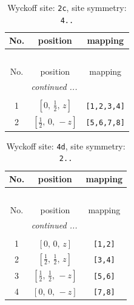 \documentclass[fleqn,8pt]{jsarticle}
\begin{document}
\renewcommand{\arraystretch}{1.2}
\begin{longtable}{ccc}
\caption{Wyckoff site: {\tt 2c}, site symmetry: {\tt 4..}}
 \\
 \hline \hline
No. & position & mapping \\ \hline \endfirsthead

\multicolumn{2}{l}{\tablename\ \thetable{}} \\
 \hline \hline
No. & position & mapping \\ \hline \endhead

 \hline \hline
\multicolumn{2}{r}{\footnotesize\it continued ...} \\ \endfoot

 \hline \hline
\multicolumn{2}{r}{} \\ \endlastfoot

1 & $\left[ 0,\, \frac{1}{2},\, z \right]$ & {\tt [1,2,3,4]} \\ \hline
2 & $\left[ \frac{1}{2},\, 0,\, - z \right]$ & {\tt [5,6,7,8]} \\
\end{longtable}
\renewcommand{\arraystretch}{1.2}
\begin{longtable}{ccc}
\caption{Wyckoff site: {\tt 4d}, site symmetry: {\tt 2..}}
 \\
 \hline \hline
No. & position & mapping \\ \hline \endfirsthead

\multicolumn{2}{l}{\tablename\ \thetable{}} \\
 \hline \hline
No. & position & mapping \\ \hline \endhead

 \hline \hline
\multicolumn{2}{r}{\footnotesize\it continued ...} \\ \endfoot

 \hline \hline
\multicolumn{2}{r}{} \\ \endlastfoot

1 & $\left[ 0,\, 0,\, z \right]$ & {\tt [1,2]} \\ \hline
2 & $\left[ \frac{1}{2},\, \frac{1}{2},\, z \right]$ & {\tt [3,4]} \\ \hline
3 & $\left[ \frac{1}{2},\, \frac{1}{2},\, - z \right]$ & {\tt [5,6]} \\ \hline
4 & $\left[ 0,\, 0,\, - z \right]$ & {\tt [7,8]} \\
\end{longtable}
\renewcommand{\arraystretch}{1.2}
\end{document}
